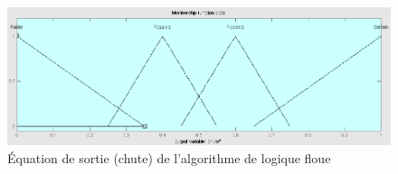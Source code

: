 \documentclass[12pt,letterpaper]{article}
\begin{document}
\begin{figure}
\centering
\includegraphics[scale=0.2]{images/f_chute.png}
\caption{Équation de sortie (chute) de l'algorithme de logique floue}
\label{fig:f_output}
\end{figure}

\begin{figure}
    \centering
    \quad
\end{figure}
\end{document}
